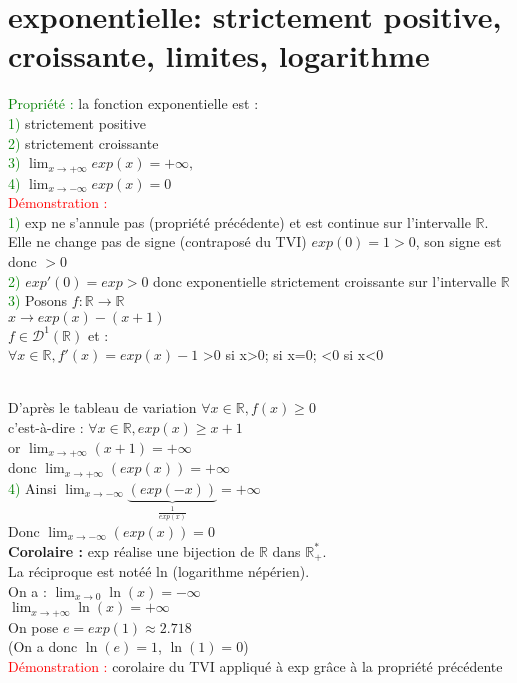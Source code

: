 \documentclass{article}
\begin{document}
	\section{exponentielle: strictement positive, croissante, limites, logarithme}
		\textcolor{green}{Propriété :} la fonction exponentielle est : \\
	\textcolor{green}{1)} strictement positive \\
	\textcolor{green}{2)} strictement croissante \\
	\textcolor{green}{3)} $\lim_{x \rightarrow + \infty} exp(x)=+ \infty,$ \\
	\textcolor{green}{4)} $\lim_{x \rightarrow - \infty} exp(x) =0$ \\
	\textcolor{red}{Démonstration :} \\
	\textcolor{green}{1)} exp ne s'annule pas (propriété précédente) et est continue sur l'intervalle $\mathbb{R}$. \\
	Elle ne change pas de signe (contraposé du TVI) $exp(0)=1>0$, son signe est donc $>0$ \\
	\textcolor{green}{2)} $exp'(0)= exp>0$ donc exponentielle strictement croissante sur l'intervalle $ \mathbb{R}$ \\
	\textcolor{green}{3)} Posons $f : \mathbb{R} \rightarrow \mathbb{R}$ \\
	$x \rightarrow exp(x)-(x+1)$ \\
	$f \in \mathcal{D}^1(\mathbb{R})$ et : \\
	\indent $\forall x \in \mathbb{R}, f'(x)= exp(x)-1$ >0 si x>0; si x=0;  \quad  <0 si x<0 \\
\\
	D'après le tableau de variation $\forall x \in \mathbb{R},f(x)\geq0$ \\
	c'est-à-dire : $\forall x \in \mathbb{R}, exp(x) \geq x+1$ \\
	or $\lim_{x \rightarrow + \infty}(x+1)= +\infty$ \\
	donc $\lim_{x \rightarrow + \infty}(exp(x))= + \infty$ \\
	\textcolor{green}{4)} Ainsi $\lim_{x \rightarrow - \infty} \underbrace{(exp(-x))}_{\frac{1}{exp(x)}}=+\infty$ \\
	Donc $\lim_{x \rightarrow - \infty}(exp(x))=0$ \\
	{\bf Corolaire :} exp réalise une bijection de $\mathbb{R}$ dans $\mathbb{R}^*_+$. \\
	La réciproque est notéé ln (logarithme népérien). \\
	On a : $\lim_{x \rightarrow 0} \ln(x)= - \infty $ \\
	\indent $ \lim_{x \rightarrow + \infty} \ln(x)=+ \infty $ \\
	On pose $e=exp(1) \approx 2.718$ \\
	(On a donc $\ln(e)=1$, $\ln(1)=0$) \\
	\textcolor{red}{Démonstration : } corolaire du TVI appliqué à exp grâce à la  propriété précédente
\end{document}
